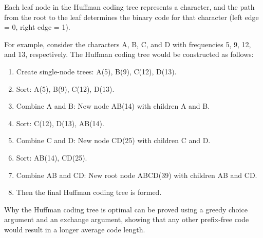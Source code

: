 \documentclass[oneside]{book}
\begin{document}
Each leaf node in the Huffman coding tree represents a character, and the path from the root to the leaf determines the binary code for that character (left edge = 0, right edge = 1).

For example, consider the characters A, B, C, and D with frequencies 5, 9, 12, and 13, respectively. The Huffman coding tree would be constructed as follows:
\begin{enumerate}
    \item Create single-node trees: A(5), B(9), C(12), D(13).
    \item Sort: A(5), B(9), C(12), D(13).
    \item Combine A and B: New node AB(14) with children A and B.
    \item Sort: C(12), D(13), AB(14).
    \item Combine C and D: New node CD(25) with children C and D.
    \item Sort: AB(14), CD(25).
    \item Combine AB and CD: New root node ABCD(39) with children AB and CD.
    \item Then the final Huffman coding tree is formed.
\end{enumerate}

Why the Huffman coding tree is optimal can be proved using a greedy choice argument and an exchange argument, showing that any other prefix-free code would result in a longer average code length.
\end{document}
